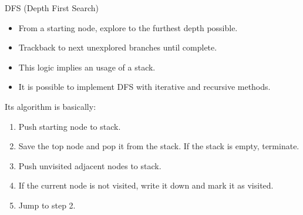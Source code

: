 \documentclass[aspectratio=169]{beamer}%
\begin{document}
\begin{frame}{DFS (Depth First Search)}
    \begin{itemize}
        \item From a starting node, explore to the furthest depth possible.
        \item Trackback to next unexplored branches until complete.
        \item This logic implies an usage of a stack.
        \item It is possible to implement DFS with iterative and recursive methods.
    \end{itemize}
    Its algorithm is basically:
    \begin{enumerate}
        \item Push starting node to stack.
        \item Save the top node and pop it from the stack. If the stack is empty, terminate.
        \item Push unvisited adjacent nodes to stack.
        \item If the current node is not visited, write it down and mark it as visited.
        \item Jump to step 2.
    \end{enumerate}
\end{frame}
\end{document}

